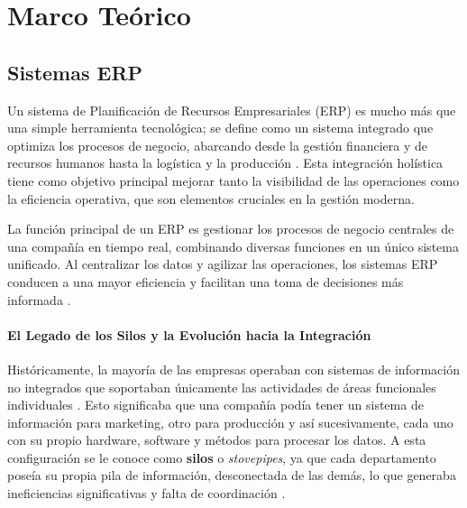 \documentclass[12pt,letterpaper,spanish]{report}
\begin{document}
\chapter{Marco Teórico}
\newpage

\section{Sistemas ERP}
Un sistema de Planificación de Recursos Empresariales (ERP) es mucho más que una simple herramienta tecnológica; se define como un sistema integrado que optimiza los procesos de negocio, abarcando desde la gestión financiera y de recursos humanos hasta la logística y la producción \citep{Hammouch_2024}. Esta integración holística tiene como objetivo principal mejorar tanto la visibilidad de las operaciones como la eficiencia operativa, que son elementos cruciales en la gestión moderna.

La función principal de un ERP es gestionar los procesos de negocio centrales de una compañía en tiempo real, combinando diversas funciones en un único sistema unificado. Al centralizar los datos y agilizar las operaciones, los sistemas ERP conducen a una mayor eficiencia y facilitan una toma de decisiones más informada \cite{Hammouch_2024}.


\subsubsection{El Legado de los Silos y la Evolución hacia la Integración}

Históricamente, la mayoría de las empresas operaban con sistemas de información no integrados que soportaban únicamente las actividades de áreas funcionales individuales \cite{book}. Esto significaba que una compañía podía tener un sistema de información para marketing, otro para producción y así sucesivamente, cada uno con su propio hardware, software y métodos para procesar los datos. A esta configuración se le conoce como \textbf{silos} o \textit{stovepipes}, ya que cada departamento poseía su propia pila de información, desconectada de las demás, lo que generaba ineficiencias significativas y falta de coordinación \cite{book}.
\end{document}
